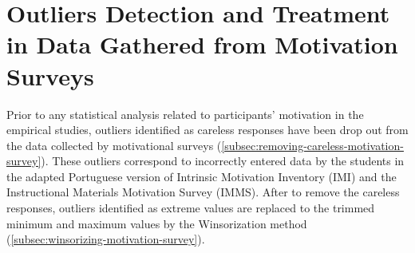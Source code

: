 
\chapter{Outliers Detection and Treatment in Data Gathered from Motivation Surveys}
\label{appendix:outliers}





Prior to any statistical analysis related to participants' motivation in the empirical studies, outliers identified as careless responses have been drop out from the data collected by motivational surveys (\autoref{subsec:removing-careless-motivation-survey}). These outliers correspond to incorrectly entered data by the students in the adapted Portuguese version of Intrinsic Motivation Inventory (IMI) and the Instructional Materials Motivation Survey (IMMS). After to remove the careless responses, outliers identified as extreme values are replaced to the trimmed minimum and maximum values by the Winsorization method (\autoref{subsec:winsorizing-motivation-survey}).

